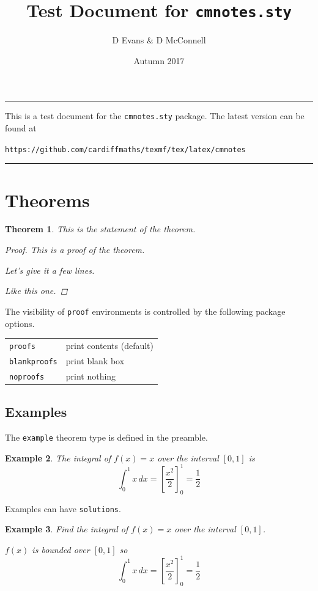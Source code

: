 \documentclass{article}
\title{Test Document for \texttt{cmnotes.sty}}
\author{D Evans \& D McConnell}
\date{Autumn 2017}
\theoremstyle{break}
\newcounter{theorem}
\newtheorem{theorem}{Theorem}
\newtheorem{example}[theorem]{Example}
\begin{document}
\maketitle
\tableofcontents
\bigskip
\hrule
\begin{center}
This is a test document for the {\tt cmnotes.sty} package. The latest version can be found at
\par
\texttt{https://github.com/cardiffmaths/texmf/tex/latex/cmnotes}
\end{center}
\hrule

\section{Theorems}

\begin{theorem}\label{thm:test}
This is the statement of the theorem.
\begin{proof}
This is a proof of the theorem.\par
Let's give it a few lines.\par
Like this one.
\end{proof}
\end{theorem}

The visibility of {\tt proof} environments is controlled by the following package options.

\bigskip
\begin{tabular}{ll}
\hline
{\tt proofs}		& print contents (default) \\
{\tt blankproofs}	& print blank box \\
{\tt noproofs}		& print nothing \\
\hline
\end{tabular}
\bigskip

\subsection{Examples}
The {\tt example} theorem type is defined in the preamble.

\begin{example}
The integral of $f(x)=x$ over the interval $[0,1]$ is
\[
\int_0^1 x\,dx = \left[\frac{x^2}{2}\right]_0^1 = \frac{1}{2}
\]
\end{example}

Examples can have {\tt solutions}.
\begin{example}
Find the integral of $f(x)=x$ over the interval $[0,1]$.
\begin{solution}
$f(x)$ is bounded over $[0,1]$ so 
\[
\int_0^1 x\,dx = \left[\frac{x^2}{2}\right]_0^1 = \frac{1}{2}
\]
\end{solution}
\end{example}
\end{document}
